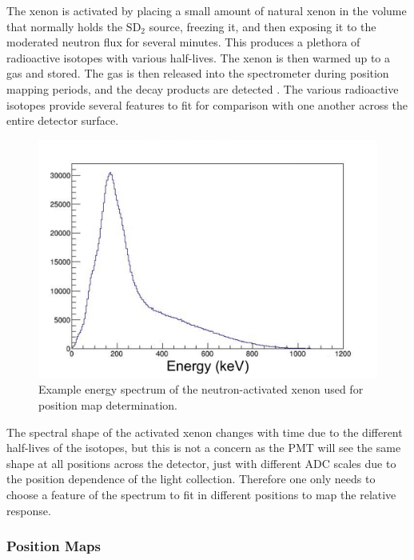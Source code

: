 The xenon is activated by placing a small amount of natural xenon in the volume that
normally holds the $\mathrm{SD}_2$ source, freezing it, and then exposing it to the moderated
neutron flux for several minutes. This produces a plethora of radioactive isotopes
with various half-lives. The xenon is then warmed up to a gas and stored. The gas
is then released into the spectrometer during position mapping periods, and the decay products
are detected \cite{mpmThesis}. The various radioactive isotopes provide several features to fit for comparison
with one another across the entire
detector surface.

\begin{figure}[h] 
\centering
\includegraphics[scale=.5]{4-UCNACalibrations/xenonSpectrum.pdf}
\caption{Example energy spectrum of the neutron-activated xenon used for position map determination. }
\label{fig:xenonSpectrum}
\end{figure}

The spectral shape of the activated xenon changes with time due to the different half-lives
of the isotopes, but this is not a concern as the PMT will see the same shape at all positions
across the detector, just with different ADC scales due to the position dependence of the light
collection. Therefore one only needs to choose a feature of the spectrum to fit in different
positions to map the relative response.

\subsubsection{Position Maps} \label{sssec:posmaps}

